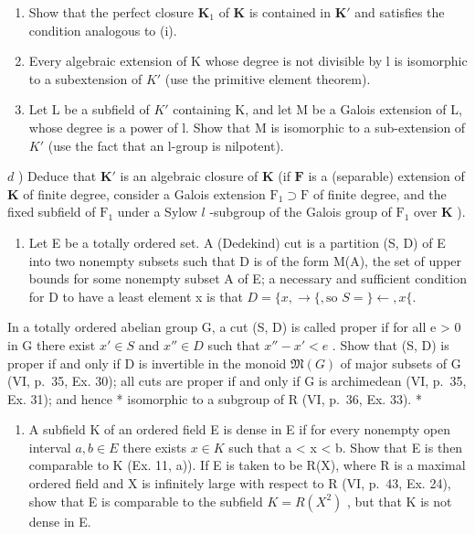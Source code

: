 \begin{enumerate}
\def\labelenumi{\alph{enumi})}
\item
  Show that the perfect closure \(\mathbf{K}_1\) of \(\mathbf{K}\) is contained in \(\mathbf{K}'\) and satisfies the condition analogous to (i).
\item
  Every algebraic extension of K whose degree is not divisible by l is isomorphic to a subextension of \(K'\) (use the primitive element theorem).
\item
  Let L be a subfield of \(K'\) containing K, and let M be a Galois extension of L, whose degree is a power of l. Show that M is isomorphic to a sub-extension of \(K'\) (use the fact that an l-group is nilpotent).
\end{enumerate}

\(d\) ) Deduce that \(\mathbf{K}'\) is an algebraic closure of \(\mathbf{K}\) (if \(\mathbf{F}\) is a (separable) extension of \(\mathbf{K}\) of finite degree, consider a Galois extension \(\mathrm{F}_1\supset \mathrm{F}\) of finite degree, and the fixed subfield of \(\mathrm{F}_1\) under a Sylow \(l\) -subgroup of the Galois group of \(\mathrm{F}_1\) over \(\mathbf{K}\) ).

\begin{enumerate}
\def\labelenumi{\arabic{enumi})}
\setcounter{enumi}{33}
\tightlist
\item
  Let E be a totally ordered set. A (Dedekind) cut is a partition (S, D) of E into two nonempty subsets such that D is of the form M(A), the set of upper bounds for some nonempty subset A of E; a necessary and sufficient condition for D to have a least element x is that \(D = \{x, \rightarrow\{, \text{so } S = \} \leftarrow, x\{.\)
\end{enumerate}

In a totally ordered abelian group G, a cut (S, D) is called proper if for all e \textgreater{} 0 in G there exist \(x' \in S\) and \(x'' \in D\) such that \(x'' - x' < e\) . Show that (S, D) is proper if and only if D is invertible in the monoid \(\mathfrak{M}(G)\) of major subsets of G (VI, p.~35, Ex. 30); all cuts are proper if and only if G is archimedean (VI, p.~35, Ex. 31); and hence * isomorphic to a subgroup of R (VI, p.~36, Ex. 33). *

\begin{enumerate}
\def\labelenumi{\arabic{enumi})}
\setcounter{enumi}{34}
\tightlist
\item
  A subfield K of an ordered field E is dense in E if for every nonempty open interval \(a, b \in E\) there exists \(x \in K\) such that a \textless{} x \textless{} b. Show that E is then comparable to K (Ex. 11, a)). If E is taken to be R(X), where R is a maximal ordered field and X is infinitely large with respect to R (VI, p.~43, Ex. 24), show that E is comparable to the subfield \(K = R(X^{2})\) , but that K is not dense in E.
\end{enumerate}


